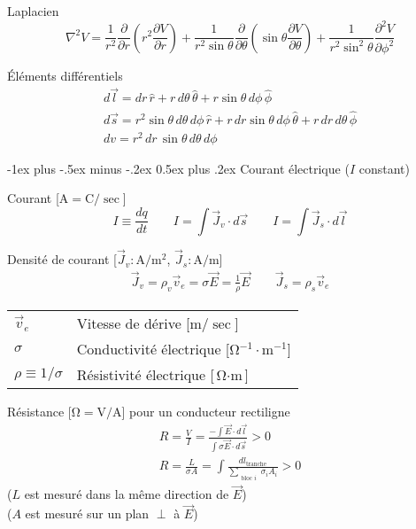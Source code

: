 \documentclass[10pt,landscape]{article}
\makeatletter
\renewcommand{\section}{\@startsection{section}{1}{0mm}%
                                {-1ex plus -.5ex minus -.2ex}%
                                {0.5ex plus .2ex}%
                                {\normalfont\large\bfseries}}
\newcommand{\extraline}{\vspace{1em}}
\newcommand{\tableindent}{\hspace{1.5em}}
\newcommand{\uvec}[1]{\ensuremath{{\hat{#1}}}}
\makeatother
\begin{document}
\begin{multicols}{3}
Laplacien
\[ \nabla^2 V = \frac{1}{r^2} \frac{\partial}{\partial r}\left( r^2 \frac{\partial V}{\partial r} \right)
+ \frac{1}{r^2\sin\theta}\frac{\partial}{\partial \theta} \left( \sin\theta \frac{\partial V}{\partial\theta} \right)
+ \frac{1}{r^2\sin^2\theta}\frac{\partial^2 V}{\partial \phi^2} \]

Éléments différentiels
\begin{gather*}
d\vec{l} = dr\,\uvec{r} + r\,d\theta\,\uvec{\theta} + r\sin\theta\,d\phi\,\uvec{\phi} \\
d\vec{s} = r^2\sin\theta\,d\theta\,d\phi\,\uvec{r} 
+ r\,dr\sin\theta\,d\phi\,\uvec{\theta}
+ r\,dr\,d\theta\,\uvec{\phi} \\
dv = r^2\,dr\,\sin\theta\,d\theta\,d\phi
\end{gather*}


\hrulefill
\section{Courant électrique ($I$ constant)}

Courant [$\si{\ampere} = \si{\coulomb}/\si{\sec}$]
\[ I \equiv \frac{dq}{dt}
\qquad
I =\int \vec{J}_v \cdot d\vec{s} \qquad
I = \int \vec{J}_s \cdot d\vec{l}
\]

Densité de courant [$\vec{J}_v: \si{\ampere/\metre^2}$, $\vec{J}_s: \si{\ampere/\metre}$]
\begin{gather*}
\vec{J}_v = \rho_v \vec{v}_e = \sigma\vec{E} = \frac{1}{\rho} \vec{E} 
\qquad
\vec{J}_s  = \rho_s \vec{v}_e
\end{gather*}
%
\begin{tabular}{@{\tableindent}ll@{}}
	$\vec{v}_e$ & Vitesse de dérive [$\si{\metre/\sec}$] \\
	$\sigma$ & Conductivité électrique [$\si{\ohm^{-1}\cdot\meter^{-1}}$] \\
	$\rho \equiv 1/\sigma$ & Résistivité électrique  [$\si{\ohm\cdot\meter}$] \\
\end{tabular}

\extraline
Résistance [$\si{\ohm} = \si{\volt/\ampere}$] pour un conducteur rectiligne
\begin{gather*}
R = \frac{V}{I}
= \frac{-\int \vec{E}\cdot{d\vec{l}}}{\int \sigma \vec{E}\cdot{d\vec{s}}} > 0  
\\
R = \frac{L}{\sigma A} 
= \int \frac{dl_\text{tranche}}
{\sum\limits_{{{\substack{\text{bloc $i$}}}}} \sigma_i A_i} > 0 
\end{gather*}
\tableindent($L$ est mesuré dans la même direction de $\vec{E}$) \\ \tableindent($A$ est mesuré sur un plan $\perp$ à $\vec{E}$)


\end{multicols}
\end{document}
